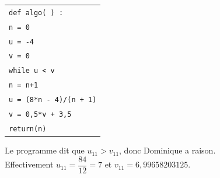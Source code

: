 \begin{center}
\begin{tabularx}{0.5\linewidth}{|X|}\hline
\quad \texttt{def algo( )  :}\\
\quad \texttt{n = 0}\\
\quad \texttt{u = -4}\\
\quad \texttt{v = 0}\\
\quad \texttt{while u < v}\\
\qquad \texttt{n = n+1}\\
\qquad \texttt{u = (8*n - 4)/(n + 1)}\\ 
\qquad \texttt{v = 0,5*v + 3,5}\\
\quad \texttt{return(n)}\\ \hline
\end{tabularx}
\end{center}

	
	Le programme dit que $u_{11} > v_{11}$, donc Dominique a raison.\\ Effectivement $u_{11} = \dfrac{84}{12} = 7$ et $v_{11} = 6,99658203125$.
